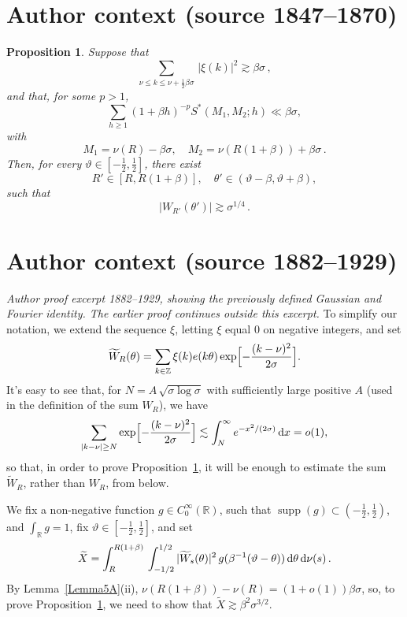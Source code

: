 \documentclass[10pt,a4paper]{amsart}
\newtheorem{proposition}{Proposition}
\newcommand{\bZ}{\mathbb Z}
\newcommand{\bR}{\mathbb R}
\begin{document}
\section*{Author context (source 1847--1870)}
\begin{proposition}\label{Lemma5}
Suppose that
\begin{equation}
\label{eq:condition1}
\sum_{\nu \le k \le \nu+\frac12 \beta\sigma}\, |\xi(k)|^2 \gtrsim \beta\sigma\,,
\end{equation}
and that, for some $p>1$,
\begin{equation}
\label{eq:condition2}
\sum_{h \ge 1} (1+\beta h)^{-p} S^*(M_1, M_2; h) \ll \beta\sigma,
\end{equation}
with
\[
M_1 = \nu (R) - \beta\sigma, \quad M_2 =  \nu(R(1+\beta)) + \beta\sigma\,.
\]
Then, for every $\vartheta\in [-\frac12, \frac12]$, there exist
\[
R'\in [R, R(1+\beta)], \quad \theta'\in (\vartheta-\beta, \vartheta+\beta),
\]
such that
\[
|W_{R'}(\theta')| \gtrsim \sigma^{1/4}\,.
\]
\end{proposition}

\section*{Author context (source 1882--1929)}
\noindent\textit{Author proof excerpt 1882--1929, showing the previously defined Gaussian and Fourier identity. The earlier proof continues outside this excerpt.}
To simplify our notation, we extend the sequence $\xi$, letting $\xi$ equal $0$
on negative integers, and set
\[
\widetilde{W}_R(\theta)
= \sum_{k\in\bZ} \xi(k)e(k\theta)\exp\Bigl[ - \frac{(k-\nu)^2}{2\sigma} \Bigr].
\]
It's easy to see that, for $N = A\,\sqrt{\sigma\log\sigma}$ with sufficiently large positive
$A$ (used in the definition of the sum $W_R$), we have
\[
\sum_{|k-\nu|\ge N} \exp\Bigl[ - \frac{(k-\nu)^2}{2\sigma} \Bigr] \lesssim
\int_N^\infty e^{-x^2/(2\sigma)}\, {\rm d}x = o(1),
\]
so that, in order to prove Proposition~\ref{Lemma5}, it will be enough to estimate the sum
$\widetilde{W}_R$, rather than $W_R$, from below.

We fix a non-negative function $g\in C_0^\infty(\bR)$, such that $\operatorname{supp}(g)\subset (-\tfrac12, \tfrac12)$, and $\displaystyle \int_\bR g = 1$, fix $\vartheta\in [-\tfrac12, \tfrac12]$,
and set
\[
\widetilde{X} =
\int_R^{R(1+\beta)}\, \int_{-1/2}^{1/2} |\widetilde{W}_s(\theta)|^2\,
g(\beta^{-1}(\vartheta-\theta))\, {\rm d}\theta\, {\rm d}\nu (s)\,.
\]
By Lemma~\ref{Lemma5A}(ii), $\nu(R(1+\beta))-\nu(R) = (1+o(1))\beta\sigma$, so, to prove Proposition~\ref{Lemma5}, 
we need to show that $\widetilde{X} \gtrsim \beta^2\sigma^{3/2}$.
\end{document}
